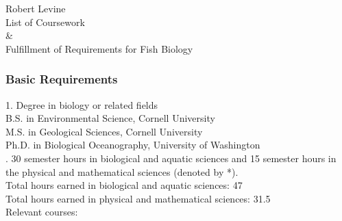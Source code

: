 \documentclass[12pt,a4paper]{article}
\begin{document}
\begin{center}
{\Large Robert Levine} 
\medskip\\
List of Coursework\\ \& \\ Fulfillment of Requirements for Fish Biology
\end{center}
\subsubsection*{Basic Requirements}

1. Degree in biology or related fields
\medskip\\ B.S. in Environmental Science, Cornell University\\
M.S. in Geological Sciences, Cornell University\\
Ph.D. in Biological Oceanography, University of Washington\\

. 30 semester hours in biological and aquatic sciences %
and 15 semester hours in the physical and mathematical sciences (denoted by *).
\medskip\\Total hours earned in biological and aquatic sciences: 47\\
Total hours earned in physical and mathematical sciences: 31.5\\
Relevant courses:\\

\end{document}
